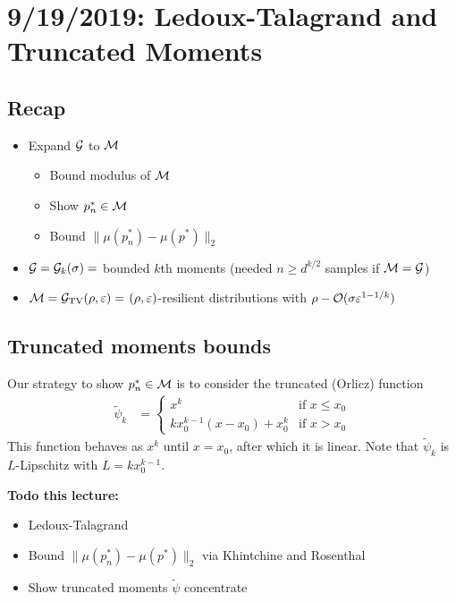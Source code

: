 \section{9/19/2019: Ledoux-Talagrand and Truncated Moments}

\subsection{Recap}

\begin{itemize}
  \item Expand $\mathcal{G}$ to $\mathcal{M}$
    \begin{itemize}
      \item Bound modulus of $\mathcal{M}$
      \item Show $p_n^* \in \mathcal{M}$
      \item Bound $\|\mu(p_n^*) - \mu(p^*)\|_2$
    \end{itemize}
  \item $\mathcal{G} = \mathcal{G}_k(\sigma) =$ bounded $k$th moments
    (needed $n \geq d^{k/2}$ samples if $\mathcal{M} = \mathcal{G}$)
  \item $\mathcal{M} = \mathcal{G}_{\operatorname{TV}}(\rho, \varepsilon) =$ $(\rho, \varepsilon)$-resilient distributions
    with $\rho - \mathcal{O}(\sigma \varepsilon^{1 - 1/k})$
\end{itemize}

\subsection{Truncated moments bounds}

Our strategy to show $p_n^* \in \mathcal{M}$ is to consider the truncated (Orlicz)
function
\begin{align}
  \tilde{\psi}_k &= \begin{cases}
    x^k &\text{if } x \leq x_0 \\
    k x_0^{k-1} (x - x_0) + x_0^k&\text{if } x > x_0
  \end{cases}
\end{align}
This function behaves as $x^k$ until $x=x_0$, after which it is linear.
Note that $\tilde{\psi}_k$ is $L$-Lipschitz with $L = k x_0^{k-1}$.

\textbf{Todo this lecture:}
\begin{itemize}
  \item Ledoux-Talagrand
  \item Bound $\|\mu(p_n^*) - \mu(p^*)\|_2$ via Khintchine and Rosenthal
  \item Show truncated moments $\tilde{\psi}$ concentrate
\end{itemize}

